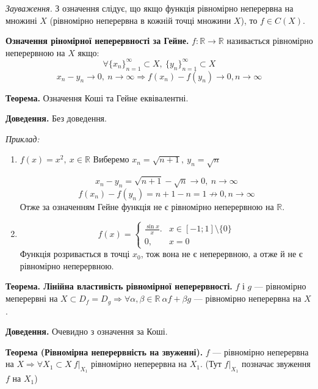 \documentclass[12pt]{report}
\begin{document}
\vspace{3mm}

\textit{Зауваження.} З означення слідує, що якщо функція рівномірно неперервна на множині $X$ (рівномірно неперервна в кожній точці множини $X$), то $f \in C(X)$.

\vspace{5mm}

\textbf{Означення ріномірної неперервності за Гейне.} $f : \mathbb{R} \to \mathbb{R}$ називається рівномірно неперервною на $X$ якщо:
$$\forall \{x_n\}_{n=1}^{\infty} \subset X,\ \{y_n\}_{n=1}^{\infty} \subset X$$
$$x_n  - y_n \to 0,\ n \to \infty \Longrightarrow f(x_n) - f(y_n) \to 0, n \to \infty$$

\vspace{5mm}

\textbf{Теорема.} Означення Коші та Гейне еквівалентні.

\textbf{Доведення.} Без доведення.

\textit{Приклад:}

\begin{enumerate}
	\item $f(x) = x^2,\ x\in \mathbb{R}$
		Виберемо $x_n = \sqrt{n+1},\ y_n = \sqrt{n}$

		$$x_n - y_n = \sqrt{n+1} - \sqrt{n} \to 0,\ n\to \infty$$
		$$f(x_n) - f(y_n) = n+1 - n = 1 \not\to 0, n\to \infty$$
		Отже за означенням Гейне функція не є рівномірно неперервною на $\mathbb{R}.$
	\item $$f(x) = \begin{cases} \frac{\sin x}{x}. & x \in [-1; 1] \setminus \{0\}\\
						   0, & x = 0\end{cases}$$
		Функція розривається в точці $x_0$, тож вона не є неперервною, а отже й не є рівномірно неперервною.
\end{enumerate}	

\vspace{3mm}

\textbf{Теорема. Лінійна властивість рівномірної неперервності.} $f$ і $g$ --- рівномірно меперервні на $X \subset D_f = D_g \Longrightarrow \forall \alpha, \beta \in \mathbb{R}\ \alpha f + \beta g$ --- рівномірно неперервна на $X$.

\textbf{Доведення.} Очевидно з означення за Коші.

\vspace{5mm}

\textbf{Теорема (Рівномірна неперервність на звуженні).} $f$ --- рівномірно неперервна на $X \Longrightarrow \forall X_1 \subset X\ f | _{X_1}$ рівномірно неперервна на $X_1$. (Тут  $f | _{X_1}$ позначає звуження $f$ на $X_1$)
\end{document}
